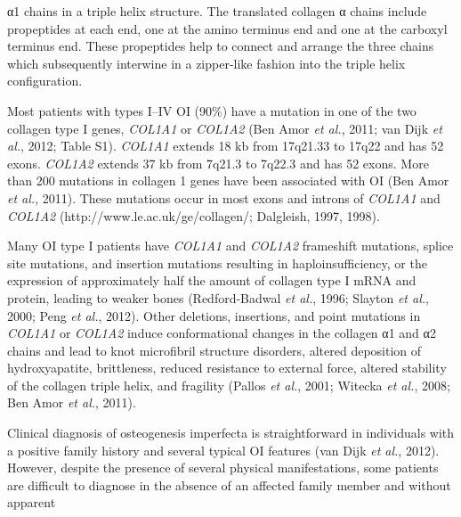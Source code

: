                 α1 chains in a triple helix structure. The translated collagen α chains include
                propeptides at each end, one at the amino terminus end and one at the carboxyl
                terminus end. These propeptides help to connect and arrange the three chains which
                subsequently interwine in a zipper-like fashion into the triple helix
                configuration.\par Most patients with types I–IV OI (90\%) have a mutation in one of the two collagen
                type I genes, \textit{COL1A1} or \textit{COL1A2} (Ben Amor \textit{et al.}, 2011; van Dijk \textit{et al.}, 2012; Table S1).
                    \textit{COL1A1} extends 18 kb from 17q21.33 to 17q22 and has 52 exons.
                    \textit{COL1A2} extends 37 kb from 7q21.3 to 7q22.3 and has 52 exons.
                More than 200 mutations in collagen 1 genes have been associated with OI (Ben Amor \textit{et al.}, 2011). These
                mutations occur in most exons and introns of \textit{COL1A1} and
                    \textit{COL1A2} (http://www.le.ac.uk/ge/collagen/; Dalgleish, 1997, 1998).\par Many OI type I patients have \textit{COL1A1} and \textit{COL1A2}
                frameshift mutations, splice site mutations, and insertion mutations resulting in
                haploinsufficiency, or the expression of approximately half the amount of collagen
                type I mRNA and protein, leading to weaker bones (Redford-Badwal \textit{et al.}, 1996; Slayton \textit{et al.}, 2000; Peng \textit{et al.}, 2012). Other deletions,
                insertions, and point mutations in \textit{COL1A1} or
                    \textit{COL1A2} induce conformational changes in the collagen α1 and α2
                chains and lead to knot microfibril structure disorders, altered deposition of
                hydroxyapatite, brittleness, reduced resistance to external force, altered stability
                of the collagen triple helix, and fragility (Pallos
                        \textit{et al.}, 2001; Witecka \textit{et al.}, 2008; Ben Amor \textit{et al.}, 2011).\par Clinical diagnosis of osteogenesis imperfecta is straightforward in individuals with
                a positive family history and several typical OI features (van Dijk \textit{et al.}, 2012). However, despite
                the presence of several physical manifestations, some patients are difficult to
                diagnose in the absence of an affected family member and without apparent
